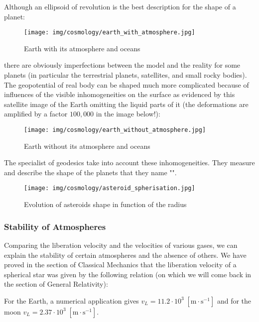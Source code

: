 	Although an ellipsoid of revolution is the best description for the shape of a planet:
	\begin{figure}[H]
		\begin{center}
		\texttt{[image: img/cosmology/earth\_with\_atmosphere.jpg]}
		\end{center}	
		\caption{Earth with its atmosphere and oceans}
	\end{figure}
	there are obviously imperfections between the model and the reality for some planets (in particular the terrestrial planets, satellites, and small rocky bodies). The geopotential of real body can be shaped much more complicated because of influences of the visible inhomogeneities on the surface as evidenced by this satellite image of the Earth omitting the liquid parts of it (the deformations are amplified by a factor $100,000$ in the image below!):
	\begin{figure}[H]
		\begin{center}
		\texttt{[image: img/cosmology/earth\_without\_atmosphere.jpg]}
		\end{center}	
		\caption{Earth without its atmosphere and oceans}
	\end{figure}
	The specialist of geodesics take into account these inhomogeneities. They measure and describe the shape of the planets that they name "".
	\begin{figure}[H]
		\begin{center}
		\texttt{[image: img/cosmology/asteroid\_spherisation.jpg]}
		\end{center}	
		\caption{Evolution of asteroids shape in function of the radius}
	\end{figure}
	
	\subsubsection{Stability of Atmospheres}
	Comparing the liberation velocity and the velocities of various gases, we can explain the stability of certain atmospheres and the absence of others. We have proved in the section of Classical Mechanics that the liberation velocity of a spherical star was given by the following relation (on which we will come back in the section of General Relativity):
	
	For the Earth, a numerical application gives $v_L=11.2\cdot 10^3\;[\text{m}\cdot \text{s}^{-1}]$ and for the moon $v_L=2.37\cdot 10^3\;[\text{m}\cdot \text{s}^{-1}]$.

